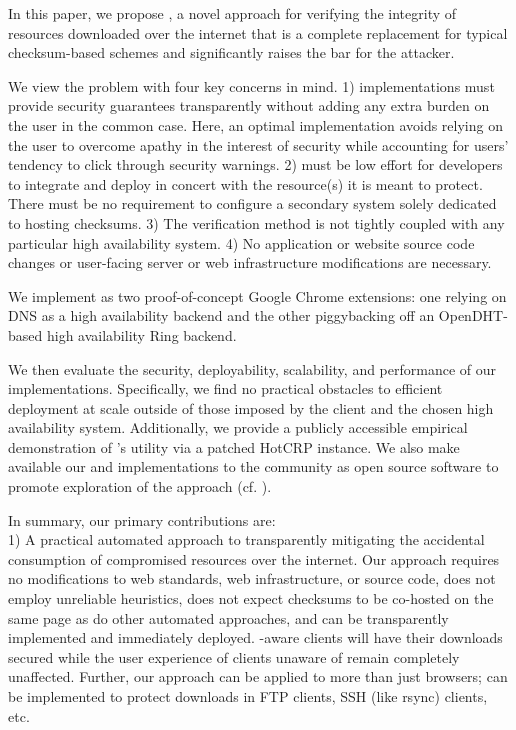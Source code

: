 In this paper, we propose \SYSTEM{}, a novel approach for verifying the
integrity of resources downloaded over the internet that is a complete
replacement for typical checksum-based schemes and significantly raises the bar
for the attacker.

We view the problem with four key concerns in mind. 1) \SYSTEM{} implementations
must provide security guarantees transparently without adding any extra burden
on the user in the common case. Here, an optimal implementation avoids
relying on the user to overcome apathy in the interest of security while
accounting for users' tendency to click through security warnings. 2) \SYSTEM{}
must be low effort for developers to integrate and deploy in concert with the
resource(s) it is meant to protect. There must be no requirement to configure a
secondary system solely dedicated to hosting checksums. 3) The verification
method is not tightly coupled with any particular high availability system. 4)
No application or website source code changes or user-facing server or web
infrastructure modifications are necessary.

We implement \SYSTEM{} as two proof-of-concept Google Chrome extensions: one
relying on DNS as a high availability backend and the other piggybacking off an
OpenDHT-based high availability Ring backend.

We then evaluate the security, deployability, scalability, and performance of
our implementations. Specifically, we find no practical obstacles to efficient
deployment at scale outside of those imposed by the client and the chosen high
availability system. Additionally, we provide a publicly accessible empirical
demonstration of \SYSTEM{}'s utility via a patched HotCRP instance. We also make
available our \DNSSYS{} and \DHTSYS{} implementations to the community as open
source software to promote exploration of the \SYSTEM{} approach (cf.
).

In summary, our primary contributions are: \\

1) A practical automated approach to transparently mitigating the accidental
consumption of compromised resources over the internet. Our approach requires no
modifications to web standards, web infrastructure, or source code, does not
employ unreliable heuristics, does not expect checksums to be co-hosted on the
same page as do other automated approaches, and can be transparently implemented
and immediately deployed. \SYSTEM{}-aware clients will have their downloads
secured while the user experience of clients unaware of \SYSTEM{} remain
completely unaffected. Further, our approach can be applied to more than just
browsers; \SYSTEM{} can be implemented to protect downloads in FTP clients, SSH
(like rsync) clients, etc. \\

